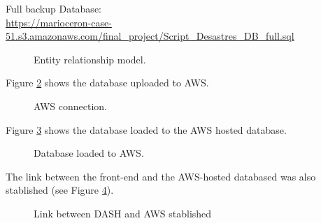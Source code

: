 Full backup Database: \\ 
\url{https://marioceron-case-51.s3.amazonaws.com/final_project/Script_Desastres_DB_full.sql}{}


 
\begin{figure}[!htb]
\caption{Entity relationship model.}
\label{fig:er_model}
\end{figure}

Figure \ref{fig:awsConnection} shows the database uploaded to AWS.

\begin{figure}[!htb]
\caption{AWS connection.}
\label{fig:awsConnection}
\end{figure}


Figure \ref{fig:databaseLoaded}  shows the database loaded to the AWS hosted database.

\begin{figure}[!htb]
\caption{Database loaded to AWS.}
\label{fig:databaseLoaded}
\end{figure}


The link between the front-end and the AWS-hosted databased was also stablished (see Figure \ref{fig:linkDASH_AWS}). 

\begin{figure}[!htb]
\caption{Link between DASH and AWS stablished}
\label{fig:linkDASH_AWS}
\end{figure}



